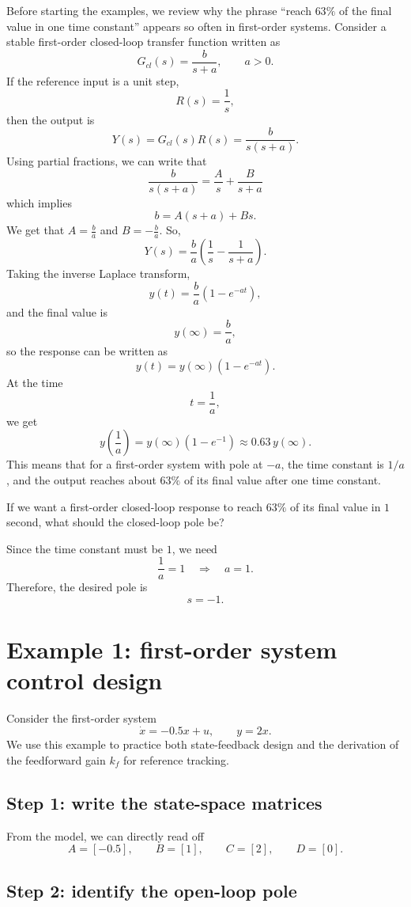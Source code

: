 \documentclass{ee122_notes}
\begin{document}
Before starting the examples, we review why the phrase ``reach \(63\%\) of the final value in one time constant'' appears so often in first-order systems. Consider a stable first-order closed-loop transfer function written as
\[
G_{cl}(s)=\frac{b}{s+a},
\qquad a>0.
\]
If the reference input is a unit step,
\[
R(s)=\frac{1}{s},
\]
then the output is
\[
Y(s)=G_{cl}(s)R(s)=\frac{b}{s(s+a)}.
\]
Using partial fractions, we can write that \[
\frac{b}{s(s+a)}=\frac{A}{s}+\frac{B}{s+a}
\]
which implies
\[
b=A(s+a)+Bs.
\]
We get that $A=\frac{b}{a}$ and $B=-\frac{b}{a}$. So,
\[
Y(s)=\frac{b}{a}\left(\frac{1}{s}-\frac{1}{s+a}\right).
\]
Taking the inverse Laplace transform,
\[
y(t)=\frac{b}{a}\left(1-e^{-at}\right),
\]
and the final value is
\[
y(\infty)=\frac{b}{a},
\]
so the response can be written as
\[
y(t)=y(\infty)\left(1-e^{-at}\right).
\]
At the time
\[
t=\frac{1}{a},
\]
we get
\[
y\left(\frac{1}{a}\right)=y(\infty)\left(1-e^{-1}\right)
\approx 0.63\,y(\infty).
\]
This means that for a first-order system with pole at \(-a\), the time constant is \(1/a\), and the output reaches about \(63\%\) of its final value after one time constant.

\begin{popquiz}
If we want a first-order closed-loop response to reach \(63\%\) of its final value in \(1\) second, what should the closed-loop pole be?
\popqsplit

Since the time constant must be \(1\), we need
\[
\frac{1}{a}=1
\quad\Longrightarrow\quad
a=1.
\]
Therefore, the desired pole is
\[
s=-1.
\]
\end{popquiz}

\section{Example 1: first-order system control design}

Consider the first-order system
\[
\dot{x}=-0.5x+u,
\qquad
y=2x.
\]
We use this example to practice both state-feedback design and the derivation of the feedforward gain \(k_f\) for reference tracking.

\subsection*{Step 1: write the state-space matrices}

From the model, we can directly read off
\[
A=[-0.5],
\qquad
B=[1],
\qquad
C=[2],
\qquad
D=[0].
\]

\subsection*{Step 2: identify the open-loop pole}
\end{document}
